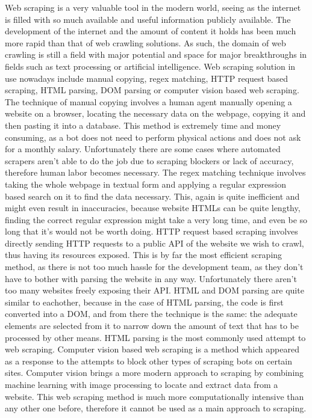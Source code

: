 \documentclass[12pt,a4paper,twoside]{report}
\begin{document}
Web scraping is a very valuable tool in the modern world, seeing as the internet is filled with so much available and useful information publicly available. The development of the internet and the amount of content it holds has been much more rapid than that of web crawling solutions. As such, the domain of web crawling is still a field with major potential and space for major breakthroughs in fields such as text processing or artificial intelligence. Web scraping solution in use nowadays include manual copying, regex matching, HTTP request based scraping, HTML parsing, DOM parsing or computer vision based web scraping. The technique of manual copying involves a human agent manually opening a website on a browser, locating the necessary data on the webpage, copying it and then pasting it into a database. This method is extremely time and money consuming, as a bot does not need to perform physical actions and does not ask for a monthly salary. Unfortunately there are some cases where automated scrapers aren't able to do the job due to scraping blockers or lack of accuracy, therefore human labor becomes necessary. The regex matching technique involves taking the whole webpage in textual form and applying a regular expression based search on it to find the data necessary. This, again is quite inefficient and might even result in inaccuracies, because website HTMLs can be quite lengthy, finding the correct regular expression might take a very long time, and even be so long that it's would not be worth doing. HTTP request based scraping involves directly sending HTTP requests to a public API of the website we wish to crawl, thus having its resources exposed. This is by far the most efficient scraping method, as there is not too much hassle for the development team, as they don't have to bother with parsing the website in any way. Unfortunately there aren't too many websites freely exposing their API. HTML and DOM parsing are quite similar to eachother, because in the case of HTML parsing, the code is first converted into a DOM, and from there the technique is the same: the adequate elements are selected from it to narrow down the amount of text that has to be processed by other means. HTML parsing is the most commonly used attempt to web scraping. Computer vision based web scraping is a method which appeared as a response to the attempts to block other types of scraping bots on certain sites. Computer vision brings a more modern approach to scraping by combining machine learning with image processing to locate and extract data from a website. This web scraping method is much more computationally intensive than any other one before, therefore it cannot be used as a main approach to scraping.
\end{document}
